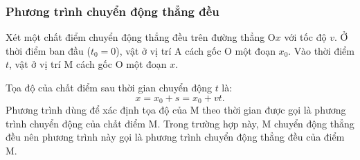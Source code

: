 \begin{tomtat}
\begin{center}
	\end{center}
	\subsubsection{Phương trình chuyển động thẳng đều}
	Xét một chất điểm chuyển động thẳng đều trên đường thẳng O$x$ với tốc độ $v$. Ở thời điểm ban đầu ($t_0=0$), vật ở vị trí A cách gốc O một đoạn $x_0$. Vào thời điểm $t$, vật ở vị trí M cách gốc O một đoạn $x$.  
	\begin{center}
	\end{center}
	
	Tọa độ của chất điểm sau thời gian chuyển động $t$ là:
	\begin{equation}
		x=x_0+s=x_0+vt.
	\end{equation}
	Phương trình dùng để xác định tọa độ của M theo thời gian được gọi là phương trình chuyển động của chất điểm M. Trong trường hợp này, M chuyển động thẳng đều nên phương trình này gọi là phương trình chuyển động thẳng đều của điểm M. 
	

	
\end{tomtat}
